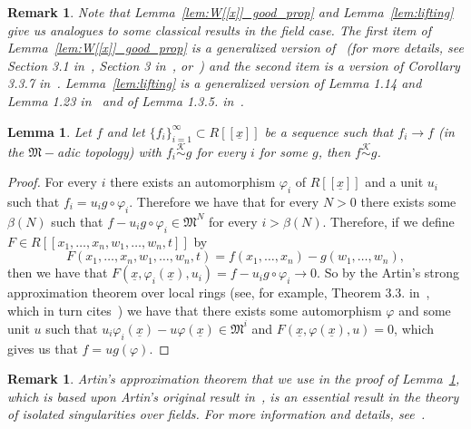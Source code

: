 \documentclass{article}
\newtheorem{lemma}[theorem]{Lemma}
\newtheorem{remark}[theorem]{Remark}
\newcommand{\equivk}{\overset{\mathcal{K}}{\sim}}
\numberwithin{theorem}{section}
\begin{document}
\begin{remark}
    \textup{Note that Lemma~\ref{lem:W[[x]]_good_prop} and Lemma~\ref{lem:lifting} give us analogues to some classical results in the field case. The first item of Lemma~\ref{lem:W[[x]]_good_prop} is a generalized version of~\cite{tougeron1968ideaux} (for more details, see Section 3.1 in~\cite{hauser2013artin}, Section 3 in~\cite{belitskii2016strong}, or~\cite{kerner2024orbits}) and the second item is a version of Corollary 3.3.7 in~\cite{de2013local}. Lemma~\ref{lem:lifting} is a generalized version of Lemma 1.14 and Lemma 1.23 in~\cite{greuel2007introduction} and of Lemma 1.3.5. in~\cite{boubakri2009hypersurface}.}
\end{remark}


\begin{lemma}\label{lem:equi_cont}
    Let $f$  and let $\{f_i\}_{i=1}^\infty \subset R[[\underline{x}]]$ be a sequence such that $f_i \to f$ (in the $\mathfrak{M}-$adic topology) with $f_i \equivk g$ for every $i$ for some $g$, then $f \equivk g$.
\end{lemma}

\begin{proof}
    For every $i$  there exists an automorphism $\varphi_i$ of $R[[\underline{x}]]$ and a unit $u_i$ such that $f_i=u_ig \circ  \varphi_i$. Therefore we have that for every $N>0$ there exists some $\beta(N)$ such that $f - u_i g \circ \varphi_i \in \mathfrak{M}^N$ for every $i> \beta(N)$. Therefore, if we define $F \in R[[x_1, \dots, x_n, w_1, \dots, w_n,t]]$ by
    \begin{equation*}
        F(x_1, \dots, x_n, w_1, \dots, w_n, t)=f (x_1, \dots, x_n)-g(w_1, \dots, w_n),
    \end{equation*}
     then we have that $F(\underline{x}, \varphi_i(\underline{x}),u_i)=f-u_i g \circ \varphi_i \to 0$.  So by the Artin's strong approximation theorem over local rings (see, for example, Theorem 3.3. in~\cite{rond2015artin}, which in turn cites~\cite{schappacher1980some, schappacher1983inegalite}) we have that there exists some automorphism $\varphi$ and some unit $u$ such that $u_i\varphi_i(\underline{x})-u\varphi(\underline{x}) \in \mathfrak{M}^i$ and $F(\underline{x}, \varphi(\underline{x}),u)=0$, which gives us that $f=ug(\varphi)$. 
\end{proof}

\begin{remark}
\textup{Artin's approximation theorem that we use in the proof of Lemma~\ref{lem:equi_cont}, which is based upon Artin's original result in~\cite{artin1969algebraic}, is an essential result in the theory of isolated singularities over fields. For more information and details, see~\cite{belitskii2020approximation, hauser2013artin}.  }
\end{remark}
\end{document}
